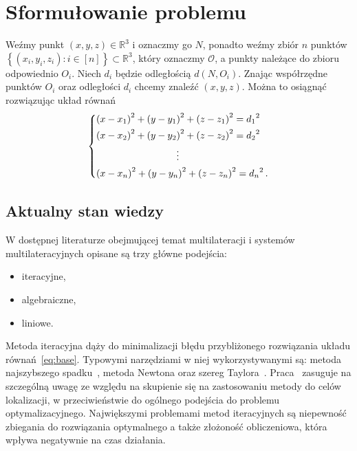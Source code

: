 \chapter{Sformułowanie problemu}\label{chap:problem}

Weźmy punkt $(x, y, z) \in \mathbb{R}^3$ i oznaczmy go $N$, ponadto weźmy zbiór $n$ punktów $\left\{(x_i, y_i, z_i): i \in [n]\right\} \subset \mathbb{R}^3$, który oznaczmy $\mathcal{O}$, a punkty należące do zbioru odpowiednio $O_i$. Niech $d_i$ będzie odległością $d(N, O_i)$. Znając współrzędne punktów $O_i$ oraz odległości $d_i$ chcemy znaleźć $(x, y, z)$. Można to osiągnąć rozwiązując układ równań
\begin{equation}\label{eq:base}
    \begin{dcases}
        {(x - x_1)}^2 + {(y - y_1)}^2 + {(z - z_1)}^2 = {d_1}^2 \\
        {(x - x_2)}^2 + {(y - y_2)}^2 + {(z - z_2)}^2 = {d_2}^2 \\
        \mspace{150mu}\vdots                                    \\
        {(x - x_n)}^2 + {(y - y_n)}^2 + {(z - z_n)}^2 = {d_n}^2\,.
    \end{dcases}
\end{equation}

\section{Aktualny stan wiedzy}

W dostępnej literaturze obejmującej temat multilateracji i systemów multilateracyjnych opisane są trzy główne podejścia:

\begin{itemize}
    \item iteracyjne,
    \item algebraiczne,
    \item liniowe.
\end{itemize}

Metoda iteracyjna dąży do minimalizacji błędu przybliżonego rozwiązania układu równań~\ref{eq:base}. Typowymi narzędziami w niej wykorzystywanymi są: metoda najszybszego spadku~\cite{doi:10.1137/0111030}, metoda Newtona oraz szereg Taylora~\cite{4101619}. Praca~\cite{4101619} zasuguje na szczególną uwagę ze względu na skupienie się na zastosowaniu metody do celów lokalizacji, w przeciwieństwie do ogólnego podejścia do problemu optymalizacyjnego. Największymi problemami metod iteracyjnych są niepewność zbiegania do rozwiązania optymalnego a także złożoność obliczeniowa, która wpływa negatywnie na czas działania.


